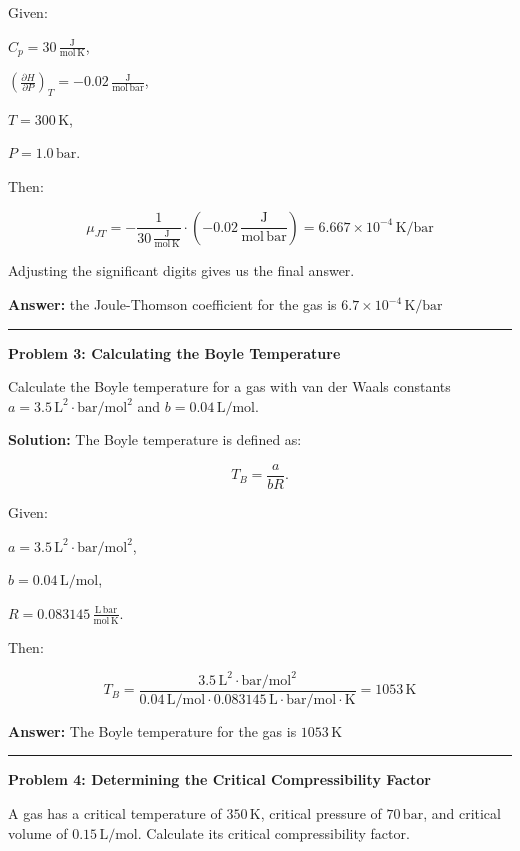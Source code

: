 \documentclass[
  9pt,
]{extbook}
\theoremstyle{definition}
\theoremstyle{definition}
\theoremstyle{definition}
\theoremstyle{remark}
\begin{document}
Given:

\(C_p = 30\,\frac{\text{J}}{\text{mol}\,\text{K}}\),

\(\left(\frac{\partial H}{\partial P}\right)_T = -0.02\,\frac{\text{J}}{\text{mol}\,\text{bar}}\),

\(T = 300\,\text{K}\),

\(P = 1.0\,\text{bar}\).

Then:

\[\mu_{JT} = -\frac{1}{30\,\frac{\text{J}}{\text{mol}\,\text{K}}} \cdot \left(-0.02\,\frac{\text{J}}{\text{mol}\,\text{bar}}\right) = 6.667 \times 10^{-4}\,\text{K}/\text{bar}\]

Adjusting the significant digits gives us the final answer.

\textbf{Answer:} the Joule-Thomson coefficient for the gas is \(6.7 \times 10^{-4}\,\text{K}/\text{bar}\)

\begin{center}\rule{0.5\linewidth}{0.5pt}\end{center}

\textbf{Problem 3: Calculating the Boyle Temperature}

Calculate the Boyle temperature for a gas with van der Waals constants \(a = 3.5\,\text{L}^2\cdot\text{bar}/\text{mol}^2\) and \(b = 0.04\,\text{L}/\text{mol}\).

\textbf{Solution:} The Boyle temperature is defined as:

\[T_B = \frac{a}{bR}.\]

Given:

\(a = 3.5\,\text{L}^2\cdot\text{bar}/\text{mol}^2\),

\(b = 0.04\,\text{L}/\text{mol}\),

\(R = 0.083145\,\frac{\text{L}\,\text{bar}}{\text{mol}\,\text{K}}\).

Then:

\[T_B = \frac{3.5\,\text{L}^2\cdot\text{bar}/\text{mol}^2}{0.04\,\text{L}/\text{mol} \cdot 0.083145\,\text{L}\cdot\text{bar}/\text{mol}\cdot\text{K}}=1053\,\text{K}\]

\textbf{Answer:} The Boyle temperature for the gas is
\(1053\,\text{K}\)

\begin{center}\rule{0.5\linewidth}{0.5pt}\end{center}

\textbf{Problem 4: Determining the Critical Compressibility Factor}

A gas has a critical temperature of \(350\,\text{K}\), critical pressure of \(70\,\text{bar}\), and critical volume of \(0.15\,\text{L}/\text{mol}\). Calculate its critical compressibility factor.
\end{document}

